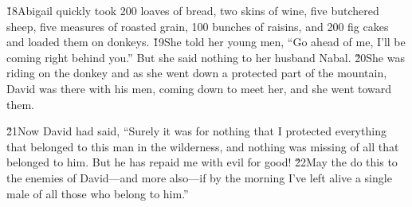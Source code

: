 \v{18}Abigail quickly took 200 loaves of bread, two skins of wine, five butchered sheep, five measures of roasted grain, 100 bunches of raisins, and 200 fig cakes and loaded them on donkeys. \v{19}She told her young men, ``Go ahead of me, I'll be coming right behind you.'' But she said nothing to her husband Nabal. \v{20}She was riding on the donkey and as she went down a protected part of the mountain, David was there with his men, coming down to meet her, and she went toward them.

\v{21}Now David had said, ``Surely it was for nothing that I protected everything that belonged to this man in the wilderness, and nothing was missing of all that belonged to him. But he has repaid me with evil for good! \v{22}May the  do this to the enemies of David---and more also---if by the morning I've left alive a single male of all those who belong to him.''

